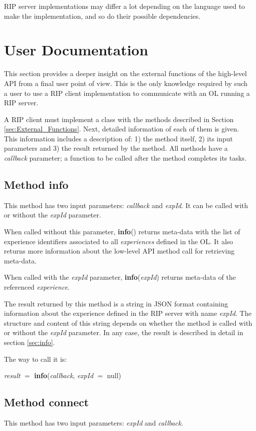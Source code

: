 RIP server implementations may differ a lot depending on the language used to make the implementation, and so do their possible dependencies.

\section{User Documentation}
\label{sec:User_Doc}
This section provides a deeper insight on the external functions of the high-level API from a final user point of view. This is the only knowledge required by such a user to use a RIP client implementation to communicate with an OL running a RIP server.

A RIP client must implement a class with the methods described in Section \ref{sec:External_Functions}. Next, detailed information of each of them is given. This information includes a description of: 1) the method itself, 2) its input parameters and 3) the result returned by the method. All methods have a \textit{callback} parameter; a function to be called after the method completes its tasks.

\subsection{Method info}
This method has two input parameters: \textit{callback} and  \textit{expId}. It can be called with or without the \textit{expId} parameter.

When called without this parameter, \textbf{info}() returns meta-data with the list of experience identifiers associated to all \textit{experiences} defined in the OL. It also returns more information about the low-level API method call for retrieving meta-data.

When called with the \textit{expId} parameter, \textbf{info}(\textit{expId}) returns meta-data of the referenced \textit{experience}.

The result returned by this method is a string in JSON format containing information about the experience defined in the RIP server with name \textit{expId}. The structure and content of this string depends on whether the method is called with or without the \textit{expId} parameter. In any case, the result is described in detail in section \ref{sec:info}.

The way to call it is:

\textit{result} $=$ \textbf{info}(\textit{callback}, \textit{expId} $=$ null)

\subsection{Method connect}
This method has two input parameters: \textit{expId} and \textit{callback}.

